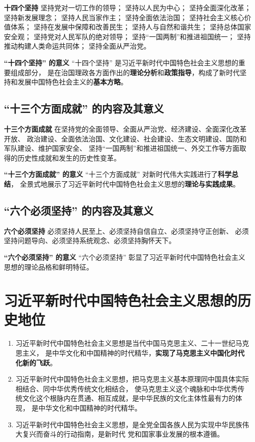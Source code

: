 \documentclass[UTF8,10pt]{ctexbook} %
\begin{document}
\textbf{十四个坚持} \quad 坚持党对一切工作的领导；
坚持以人民为中心；
坚持全面深化改革；
坚持新发展理念；
坚持人民当家作主；
坚持全面依法治国；
坚持社会主义核心价值体系；
坚持在发展中保障和改善民生；
坚持人与自然和谐共生；
坚持总体国家安全观；
坚持党对人民军队的绝对领导；
坚持“一国两制”和推进祖国统一；
坚持推动构建人类命运共同体；
坚持全面从严治党。

\textbf{“十四个坚持” 的意义} \quad “十四个坚持” 是习近平新时代中国特色社会主义思想的重要组成部分，
是在治国理政各方面作出的\textbf{理论分析}和\textbf{政策指导}，构成了新时代坚持和发展中国特色社会主义的\textbf{基本方略}。

\subsection{“十三个方面成就” 的内容及其意义}

\textbf{十三个方面成就} \quad 在坚持党的全面领导、全面从严治党、经济建设、全面深化改革开放、
政治建设、全面依法治国、文化建设、社会建设、生态文明建设、国防和军队建设、维护国家安全、
坚持“一国两制”和推进祖国统一、外交工作等方面取得的历史性成就和发生的历史性变革。

\textbf{“十三个方面成就” 的意义} \quad “十三个方面成就” 对新时代伟大实践进行了\textbf{科学总结}，
全景式地展示了习近平新时代中国特色社会主义思想的\textbf{理论与实践成果}。

\subsection{“六个必须坚持” 的内容及其意义}

\textbf{六个必须坚持} \quad 必须坚持人民至上、必须坚持自信自立、必须坚持守正创新、
必须坚持问题导向、必须坚持系统观念、必须坚持胸怀天下。

\textbf{“六个必须坚持” 的意义} \quad “六个必须坚持” 彰显了习近平新时代中国特色社会主义思想的理论品格和鲜明特征。

\section{习近平新时代中国特色社会主义思想的历史地位}

\begin{enumerate}[itemsep=0pt]
    \item 习近平新时代中国特色社会主义思想是当代中国马克思主义、二十一世纪马克思主义，
    是中华文化和中国精神的时代精华，\textbf{实现了马克思主义中国化时代化新的飞跃}。
    
    \item 习近平新时代中国特色社会主义思想，把马克思主义基本原理同中国具体实际相结合、同中华优秀传统文化相结合，
    使马克思主义这个魂脉和中华优秀传统文化这个根脉内在贯通、相互成就，是中华民族的文化主体性最有力的体现，
    是中华文化和中国精神的时代精华。
    
    \item 习近平新时代中国特色社会主义思想，是全党全国各族人民为实现中华民族伟大复兴而奋斗的行动指南，是新时代
    党和国家事业发展的根本遵循。
\end{enumerate}
\end{document}

